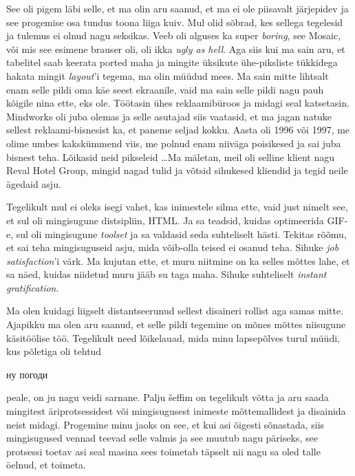  
See oli pigem läbi selle, et ma olin aru saanud, et ma ei ole piisavalt 
järjepidev ja see progemise osa  tundus toona liiga kuiv. Mul olid sõbrad, kes 
sellega tegelesid ja tulemus ei olnud nagu seksikas. Veeb oli alguses ka super 
\emph{boring}, see Mosaic, või mis see esimene brauser oli, oli ikka \emph{ugly 
as hell}. Aga siis kui ma sain aru, et tabelitel saab keerata ported maha ja  
mingite üksikute ühe-piksliste tükkidega hakata mingit \emph{layout}'i tegema,  
ma olin müüdud mees. Ma sain mitte lihtsalt enam selle pildi oma käe seest 
ekraanile, vaid ma sain selle pildi nagu pauh kõigile nina ette, eks ole.  
Töötasin ühes reklaamibüroos ja midagi  seal katsetasin. 
Mindworks oli juba olemas ja selle asutajad siis vaatasid, et 
ma jagan natuke sellest reklaami-bisnesist ka, et paneme seljad kokku. Aasta 
oli 1996 või 1997, me olime umbes kakskümmend viis, me polnud enam niiväga 
poisikesed ja sai juba bisnest teha. Lõikasid neid pikseleid \ldots Ma mäletan, 
meil oli selline klient nagu Reval Hotel Group, mingid nagad tulid ja võtsid 
sihukesed kliendid ja tegid neile ägedaid asju.


Tegelikult mul ei oleks isegi vahet, kas inimestele silma ette, vaid just 
nimelt see, et sul oli mingisugune distsipliin, HTML. Ja sa teadsid, kuidas 
optimeerida GIF-e, sul oli mingisugune \emph{toolset} ja sa valdasid seda 
suhteliselt hästi. Tekitas rõõmu, et  sai teha mingisuguseid asju, mida 
võib-olla teised ei osanud teha. Sihuke \emph{job satisfaction}'i värk. Ma 
kujutan ette, et muru niitmine on ka selles mõttes lahe, et sa näed, kuidas 
niidetud muru jääb su taga maha. Sihuke suhteliselt \emph{instant 
gratification}.


Ma olen kuidagi liigselt distantseerunud sellest disaineri rollist aga samas 
mitte. Ajapikku ma olen aru saanud, et selle pildi tegemine on mõnes mõttes 
niisugune käsitöölise töö. Tegelikult need lõikelauad, mida minu lapsepõlves 
turul müüdi, kus  põletiga oli tehtud \begin{russian}ну погоди\end{russian} 
peale, on ju nagu veidi sarnane. Palju  šeffim on tegelikult võtta ja aru saada 
mingitest äriprotsessidest või mingisugusest inimeste mõttemallidest ja 
disainida neist midagi. Progemine minu jaoks on see, et kui asi õigesti 
sõnastada, siis mingisugused vennad teevad selle valmis ja see muutub nagu 
päriseks, see  protsessi toetav  asi seal masina sees toimetab täpselt nii nagu 
sa oled talle  öelnud, et toimeta. 

